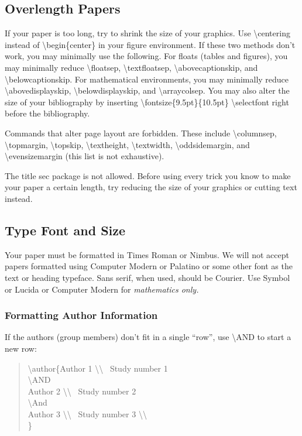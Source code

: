 \documentclass[letterpaper]{article}
\begin{document}
\subsection{Overlength Papers}
If your paper is too long, try to shrink the size of your graphics. Use \textbackslash centering instead of \textbackslash begin\{center\} in your figure environment. If these two methods don't work, you may minimally use the following. For floats (tables and figures), you may minimally reduce \textbackslash floatsep, \textbackslash textfloatsep, \textbackslash abovecaptionskip, and \textbackslash belowcaptionskip. For mathematical environments, you may minimally reduce \textbackslash abovedisplayskip, \textbackslash belowdisplayskip, and \textbackslash arraycolsep. You may also alter the size of your bibliography by inserting \textbackslash fontsize\{9.5pt\}\{10.5pt\} \textbackslash selectfont
right before the bibliography. 

Commands that alter page layout are forbidden. These include \textbackslash columnsep, \textbackslash topmargin, \textbackslash topskip, \textbackslash textheight, \textbackslash textwidth, \textbackslash oddsidemargin, and \textbackslash evensizemargin (this list is not exhaustive). 

The title sec package is not allowed. Before using every trick you know to make your paper a certain length, try reducing the size of your graphics or cutting text instead.

\subsection{Type Font and Size}
Your paper must be formatted in Times Roman or Nimbus. We will not accept papers formatted using Computer Modern or Palatino or some other font as the text or heading typeface. Sans serif, when used, should be Courier. Use Symbol or Lucida or Computer Modern for \textit{mathematics only. } 

\subsubsection{Formatting Author Information}
If the authors (group members) don't fit in a single ``row'', use \textbackslash AND to start a new row:
\begin{quote}
\begin{small}
\textbackslash author\{Author 1 \textbackslash\textbackslash ~ Study number 1  \\
\textbackslash AND\\
Author 2 \textbackslash\textbackslash ~ Study number 2  \\
\textbackslash And\\
Author 3 \textbackslash\textbackslash ~ Study number 3 \textbackslash\textbackslash ~ \\\}
\end{small}
\end{quote}
\end{document}
